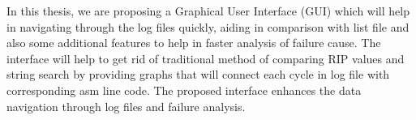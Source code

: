 In this thesis, we are proposing a Graphical User Interface (GUI) which will help in navigating through the log files quickly, aiding in comparison with list file and also some additional features to help in faster analysis of failure cause. The interface will help to get rid of traditional method of comparing RIP values and string search by providing graphs that will connect each cycle in log file with corresponding asm line code. The proposed interface enhances the data navigation through log files and failure analysis. 











